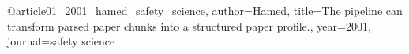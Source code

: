 @article{01_2001_hamed_safety_science,
  author={Hamed},
  title={The pipeline can transform parsed paper chunks into a structured paper profile.},
  year={2001},
  journal={safety science}
}